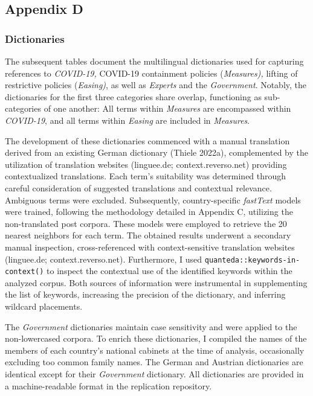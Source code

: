 \documentclass[
]{ccr}
\begin{document}
\newpage
\renewcommand{\thefigure}{D\arabic{figure}}
\renewcommand{\thetable}{D\arabic{table}}
\setcounter{figure}{0}
\setcounter{table}{0}

\hypertarget{appendix-d}{%
\subsection{Appendix D}\label{appendix-d}}

\hypertarget{dictionaries}{%
\subsubsection{Dictionaries}\label{dictionaries}}

The subsequent tables document the multilingual dictionaries used for
capturing references to \emph{COVID-19,} COVID-19 containment policies
(\emph{Measures),} lifting of restrictive policies (\emph{Easing)}, as
well as \emph{Experts} and the \emph{Government}. Notably, the
dictionaries for the first three categories share overlap, functioning
as sub-categories of one another: All terms within \emph{Measures} are
encompassed within \emph{COVID-19}, and all terms within \emph{Easing}
are included in \emph{Measures}.

The development of these dictionaries commenced with a manual
translation derived from an existing German dictionary (Thiele 2022a),
complemented by the utilization of translation websites (linguee.de;
context.reverso.net) providing contextualized translations. Each term's
suitability was determined through careful consideration of suggested
translations and contextual relevance. Ambiguous terms were excluded.
Subsequently, country-specific \emph{fastText} models were trained,
following the methodology detailed in Appendix C, utilizing the
non-translated post corpora. These models were employed to retrieve the
20 nearest neighbors for each term. The obtained results underwent a
secondary manual inspection, cross-referenced with context-sensitive
translation websites (linguee.de; context.reverso.net). Furthermore, I
used \texttt{quanteda::keywords-in-context()} to inspect the contextual
use of the identified keywords within the analyzed corpus. Both sources
of information were instrumental in supplementing the list of keywords,
increasing the precision of the dictionary, and inferring wildcard
placements.

The \emph{Government} dictionaries maintain case sensitivity and were
applied to the non-lowercased corpora. To enrich these dictionaries, I
compiled the names of the members of each country's national cabinets at
the time of analysis, occasionally excluding too common family names.
The German and Austrian dictionaries are identical except for their
\emph{Government} dictionary. All dictionaries are provided in a
machine-readable format in the replication repository.
\end{document}
